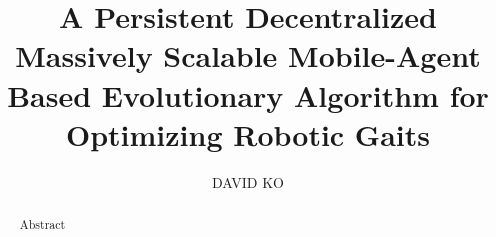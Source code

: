 \documentclass[11pt]{style/ucthesis}
\begin{document}
\title{A Persistent Decentralized Massively Scalable Mobile-Agent Based Evolutionary Algorithm for Optimizing Robotic Gaits}
\author{DAVID KO}

\begin{frontmatter}

\maketitle
\begin{abstract}
Abstract
\end{abstract}
\tableofcontents
\listoffigures
\listoftables



\end{frontmatter}









%





\end{document}
